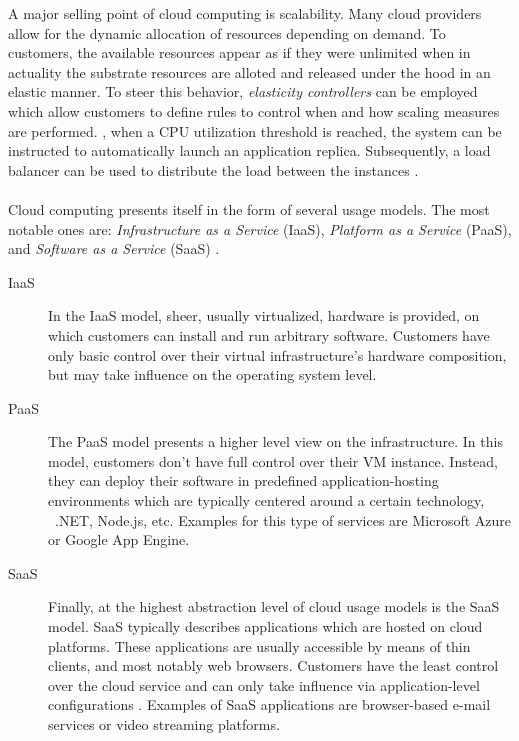 A major selling point of cloud computing is scalability. Many cloud providers allow for the dynamic allocation of resources depending on demand. To customers, the available resources appear as if they were unlimited when in actuality the substrate resources are alloted and released under the hood in an elastic manner. To steer this behavior, \emph{elasticity controllers} can be employed which allow customers to define rules to control when and how scaling measures are performed. \Eg , when a CPU utilization threshold is reached, the system can be instructed to automatically launch an application replica. Subsequently, a load balancer can be used to distribute the load between the instances \cite{vaquero2011dynamically}.


\paragraph{}
Cloud computing presents itself in the form of several usage models. The most notable ones are: \emph{Infrastructure as a Service} (IaaS),  \emph{Platform as a Service} (PaaS),  and \emph{Software as a Service} (SaaS) \cite{mell2011nist}.

\begin{description}
\item[IaaS] In the IaaS model, sheer, usually virtualized, hardware is provided, on which customers can install and run arbitrary software. Customers have only basic control over their virtual infrastructure's hardware composition, but may take influence on the operating system level.
\item[PaaS] The PaaS model presents a higher level view on the infrastructure. In this model, customers don't have full control over their VM instance. Instead, they can deploy their software in predefined application-hosting environments \cite{mell2011nist} which are typically centered around a certain technology, \eg\ .NET, Node.js, etc. Examples for this type of services are Microsoft Azure or Google App Engine.
\item[SaaS] Finally, at the highest abstraction level of cloud usage models is the SaaS model. SaaS typically describes applications which are hosted on cloud platforms. These applications are usually accessible by means of thin clients, and most notably web browsers. Customers have the least control over the cloud service and can only take influence via application-level configurations \cite{mell2011nist}. Examples of SaaS applications are browser-based e-mail services or video streaming platforms.
\end{description}


